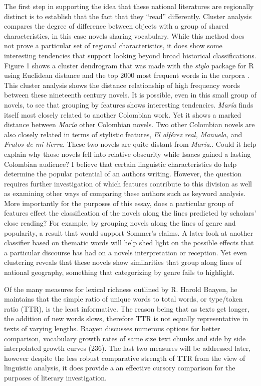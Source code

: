 \documentclass[12pt]{report}
\begin{document}
The first step in supporting the idea that these national literatures are regionally distinct is to establish that the fact that they \enquote{read} differently.
Cluster analysis compares the degree of difference between objects with a group of shared characteristics, in this case novels sharing vocabulary.
While this method does not prove a particular set of regional characteristics, it does show some interesting tendencies that support looking beyond broad historical classifications. 
Figure 1 shows a cluster dendrogram that was made with the \textit{stylo} package for R using Euclidean distance and the top 2000 most frequent words in the corpora \autocite{Eder2013, RCT2014}.
This cluster analysis shows the distance relationship of high frequency words between these nineteenth century novels.
It is possible, even in this small group of novels, to see that grouping by features shows interesting tendencies. 
\textit{María} finds itself most closely related to another Colombian work.
Yet it shows a marked distance between \textit{María} other Colombian novels.
Two other Colombian novels are also closely related in terms of stylistic features, \textit{El alférez real,} \textit{Manuela,} and \textit{Frutos de mi tierra}.
These two novels are quite distant from \textit{María}..
Could it help explain why those novels fell into relative obscurity while Isaacs gained a lasting Colombian audience?
I believe that certain linguistic characteristics do help determine the popular potential of an authors writing.
However, the question requires further investigation of which features contribute to this division as well as examining other ways of comparing these authors such as keyword analysis.
More importantly for the purposes of this essay, does a particular group of features effect the classification of the novels along the lines predicted by scholars' close reading?
For example, by grouping novels along the lines of genre and popularity, a result that would support Sommer's claims.
A later look at another classifier based on thematic words will help shed light on the possible effects that a particular discourse has had on a novels interpretation or reception.
Yet even clustering reveals that these novels show similarities that group along lines of national geography, something that categorizing by genre fails to highlight.



Of the many measures for lexical richness outlined by R. Harold Baayen, he maintains that the simple ratio of unique words to total words, or type/token ratio (TTR), is the least informative. 
The reason being that as texts get longer, the addition of new words slows, therefore TTR is not equally representative in texts of varying lengths. 
Baayen discusses numerous options for better comparison, vocabulary growth rates of same size text chunks and side by side interpolated growth curves (236)\nocite{Baayen2008}.
The last two measures will be addressed later, however despite the less robust comparative strength of TTR from the view of linguistic analysis, it does provide a an effective cursory comparison for the purposes of literary investigation. 
\end{document}
